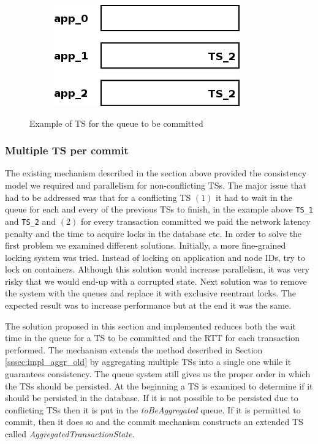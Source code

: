 \begin{figure}
\begin{subfigure}[t]{0.3\textwidth}
    \caption{}
    \label{fig:impl_tx_aggr_sub3}
  \end{subfigure}
  \qquad
  \begin{subfigure}[t]{0.3\textwidth}
    \includegraphics[scale=0.4]{resources/images/Implementation/commit_system_4.png}
    \caption{}
    \label{fig:impl_tx_aggr_sub4}
  \end{subfigure}

  \caption{Example of TS for the queue to be committed}
  \label{fig:impl_tx_aggr_queue}
\end{figure}

\subsubsection{Multiple TS per commit}
\label{sssec:impl_aggr_new}
The existing mechanism described in the section above provided the
consistency model we required and parallelism for
non-conflicting TSs. The major issue that had to be addressed was that
for a conflicting TS $(1)$ it had to wait in the queue for each and
every of the previous TSs to finish, in the example above \texttt{TS\_1} and \texttt{TS\_2} and
$(2)$ for every transaction committed we paid the network latency
penalty and the time to acquire locks in the database etc. In order to solve
the first problem we examined different solutions. Initially,
a more fine-grained locking system was tried. Instead of locking on application and
node IDs, try to lock on containers. Although this solution would
increase parallelism, it was very risky that we would end-up with a
corrupted state. Next solution was to remove the system with the
queues and replace it with exclusive reentrant locks. The expected
result was to increase performance but at the end it was the same.

The solution proposed in this section and implemented reduces both the
wait time in the queue for a TS to be committed and the RTT for each
transaction performed. The mechanism extends the method described in
Section \ref{sssec:impl_aggr_old} by aggregating multiple TSs into a
single one while it guarantees consistency. The queue system still
gives us the proper order in which the TSs should be persisted. At the
beginning a TS
is examined to determine if it should be persisted in the database. If it is not
possible to be persisted due to conflicting TSs then it is put in the
\emph{toBeAggregated} queue. If it is permitted to commit, then it does so
and the commit mechanism constructs an extended TS called
\emph{AggregatedTransactionState}.

